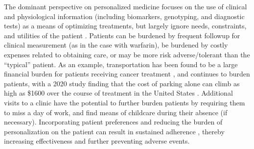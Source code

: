 The dominant perspective on personalized medicine focuses on the use of clinical and physiological information (including biomarkers, genotyping, and diagnostic tests) as a means of optimizing treatments, but largely ignore needs, constraints, and utilities of the patient \cite{rogowski2015concepts, di2017personalized}. Patients can be burdened by frequent followup for clinical measurement (as in the case with warfarin), be burdened by costly expenses related to obtaining care, or may be more risk adverse/tolerant than the ``typical'' patient. As an example, transportation has been found to be a large financial burden for patients receiving cancer treatment \cite{houts1984nonmedical}, and continues to burden patients, with a 2020 study finding that the cost of parking alone can climb as high as \$1600 over the course of treatment in the United States \cite{lee2020assessment}.  Additional visits to a clinic have the potential to further burden patients by requiring them to miss a day of work, and find means of childcare during their absence (if necessary). Incorporating patient preferences and reducing the burden of personalization on the patient can result in sustained adherence \cite{elliott2008understanding}, thereby increasing effectiveness and further preventing adverse events.


